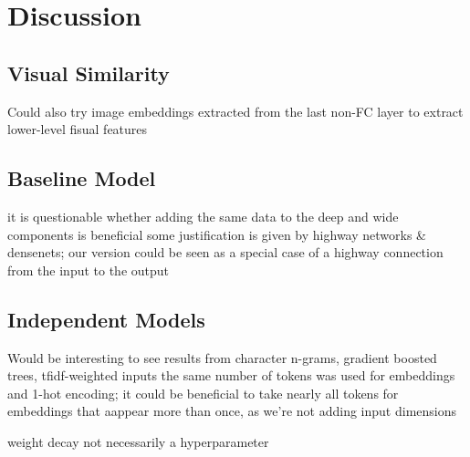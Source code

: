 \chapter{Discussion}

\section{Visual Similarity}

Could also try image embeddings extracted from the last non-FC layer to extract lower-level fisual features

\section{Baseline Model}

it is questionable whether adding the same data to the deep and wide components is beneficial
  some justification is given by highway networks \& densenets; our version could be seen as a special case of a highway connection from the input to the output

\section{Independent Models}

Would be interesting to see results from character n-grams, gradient boosted trees, tfidf-weighted inputs
the same number of tokens was used for embeddings and 1-hot encoding; it could be beneficial to take nearly all tokens for embeddings that aappear more than once, as we're not adding input dimensions

weight decay not necessarily a hyperparameter
